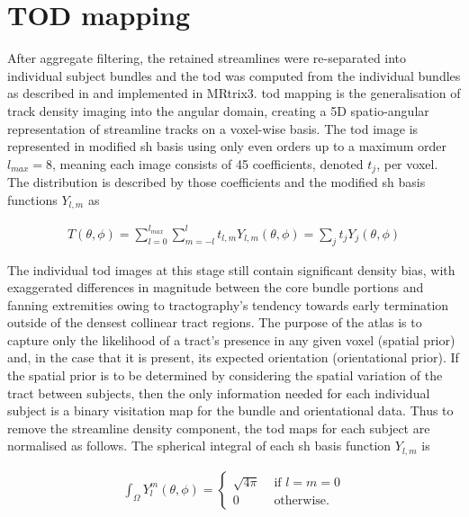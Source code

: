 \section{TOD mapping}



After aggregate filtering, the retained streamlines were re-separated into individual subject bundles and the \gls{tod} was computed from the individual bundles as described in \textcite{Dhollander2014} and implemented in MRtrix3. \autocite{Tournier2019}
\gls{tod} mapping is the generalisation of track density imaging into the angular domain, creating a 5D spatio-angular representation of streamline tracks on a voxel-wise basis.
The \gls{tod} image is represented in modified \gls{sh} basis \autocite{Descoteaux2006} using only even orders up to a maximum order $l_{max}=8$, meaning each image consists of 45 coefficients, denoted $t_j$, per voxel.
The distribution is described by those coefficients and the modified \gls{sh} basis functions $Y_{l,m}$ \autocite{Descoteaux2006} as

\begin{align}
  T(\theta, \phi) = \sum_{l=0}^{l_{max}} \sum_{m=-l}^l t_{l,m} Y_{l,m}(\theta, \phi) = \sum_j t_jY_j(\theta, \phi)
\end{align}

The individual \gls{tod} images at this stage still contain significant density bias, with exaggerated differences in magnitude between the core bundle portions and fanning extremities owing to tractography's tendency towards early termination outside of the densest collinear tract regions.\autocite{Rheault2020,Smith2013}
The purpose of the atlas is to capture only the likelihood of a tract's presence in any given voxel (spatial prior) and, in the case that it is present, its expected orientation (orientational prior).
If the spatial prior is to be determined by considering the spatial variation of the tract between subjects, then the only information needed for each individual subject is a binary visitation map for the bundle and orientational data.
Thus to remove the streamline density component, the \gls{tod} maps for each subject are normalised as follows.
The spherical integral of each \gls{sh} basis function $Y_{l,m}$ is

\begin{align}
  \int_{\Omega} Y^m_l(\theta, \phi) = \begin{cases}
   \sqrt{4\pi} & \text{ if } l=m=0\\
   0 & \text{ otherwise. }
  \end{cases}
\end{align}

